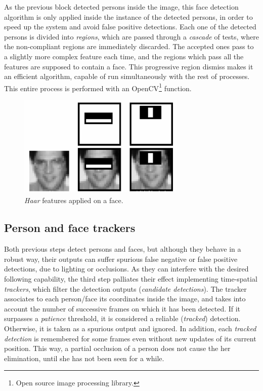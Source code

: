 As the previous block detected persons inside the image, this face detection algorithm is only applied inside the instance of the detected persons, in order to speed up the system and avoid false positive detections. Each one of the detected persons is divided into \emph{regions}, which are passed through a \emph{cascade} of tests, where the non-compliant regions are immediately discarded. The accepted ones pass to a slightly more complex feature each time, and the regions which pass all the features are supposed to contain a face. This progressive region dismiss makes it an efficient algorithm, capable of run simultaneously with the rest of processes. This entire process is performed with an OpenCV\footnote{Open source image processing library.} function.

\begin{figure}[h]
	\centering
	\includegraphics[width=8cm]{images/haar_on_face}
	\caption{\emph{Haar} features applied on a face.}
	\label{fig:perception_haar}
\end{figure}


\subsection{Person and face trackers}

Both previous steps detect persons and faces, but although they behave in a robust way, their outputs can suffer spurious false negative or false positive detections, due to lighting or occlusions. As they can interfere with the desired following capability, the third step palliates their effect implementing time-spatial \emph{trackers}, which filter the detection outputs (\emph{candidate detections}). The tracker associates to each person/face its coordinates inside the image, and takes into account the number of successive frames on which it has been detected. If it surpasses a \emph{patience} threshold, it is considered a reliable (\emph{tracked}) detection. Otherwise, it is taken as a spurious output and ignored. In addition, each \emph{tracked detection} is remembered for some frames even without new updates of its current position. This way, a partial occlusion of a person does not cause the her elimination, until she has not been seen for a while.

